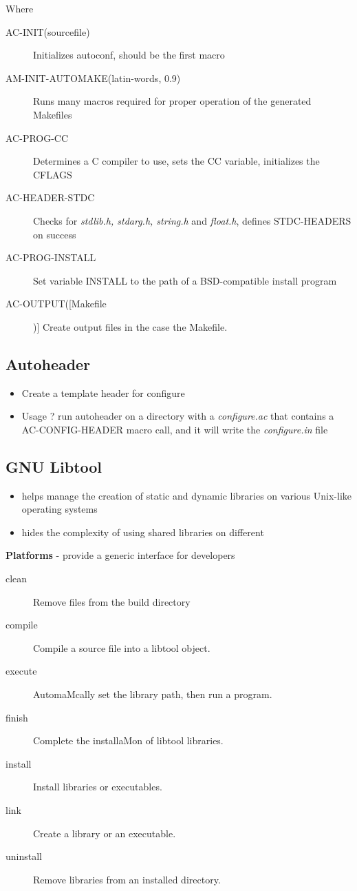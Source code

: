 Where 
\begin{description}
	\item[AC-INIT(sourcefile)] Initializes autoconf, should be the first macro \cite{autoconf}
	\item[AM-INIT-AUTOMAKE(latin-words, 0.9)]  Runs many macros required for proper operation of the generated Makefiles
	\item[AC-PROG-CC] Determines a C compiler to use, sets the CC variable, initializes the CFLAGS
	\item[AC-HEADER-STDC] Checks for \textit{stdlib.h, stdarg.h, string.h} and \textit{float.h},  defines STDC-HEADERS on success
	\item[AC-PROG-INSTALL] Set variable INSTALL to the path of a BSD-compatible install program
	\item[AC-OUTPUT([Makefile])] Create output files in the case the Makefile.
\end{description}

\subsection{Autoheader}
\begin{itemize}
	\item Create a template header for configure 
	\item Usage ? run autoheader on a directory with a \textit{configure.ac} that contains a AC-CONFIG-HEADER macro call,  and it will write the \textit{configure.in} file 
\end{itemize}

\subsection{GNU Libtool}
\begin{itemize}
	\item helps manage the creation of static and dynamic libraries on various Unix-like operating systems
	\item hides the complexity of using shared libraries on different \cite{libtool}
\end{itemize}

\textbf{Platforms} - provide a generic interface for developers  

\begin{description}
\item[clean]  Remove files from the build directory 
\item [compile]  Compile a source file into a libtool object. 
\item [execute] AutomaMcally set the library path, then run a program. 
\item [finish]  Complete the installaMon of libtool libraries. 
\item [install]  Install libraries or executables. 
\item [link]  Create a library or an executable. 
\item [uninstall] Remove libraries from an installed directory.
\end{description}

